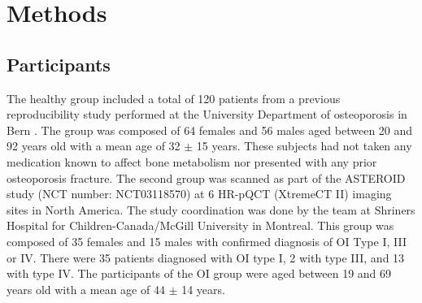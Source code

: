 \documentclass[a4paper,fleqn]{DC_ArtStyle}
\begin{document}
	
	\section{Methods}
	
	\subsection{Participants}
	The healthy group included a total of 120 patients from a previous reproducibility study performed at the University Department of osteoporosis in Bern \cite{Schenk2020}. The group was composed of 64 females and 56 males aged between 20 and 92 years old with a mean age of 32 $\pm$ 15 years. These subjects had not taken any medication known to affect bone metabolism nor presented with any prior osteoporosis fracture. The second group was scanned as part of the ASTEROID study (NCT number: NCT03118570) at 6 HR-pQCT (XtremeCT II) imaging sites in North America. The study coordination was done by the team at Shriners Hospital for Children-Canada/McGill University in Montreal. This group was composed of 35 females and 15 males with confirmed diagnosis of OI Type I, III or IV. There were 35 patients diagnosed with OI type I, 2 with type III, and 13 with type IV. The participants of the OI group were aged between 19 and 69 years old with a mean age of 44 $\pm$ 14 years.
	
\end{document}
